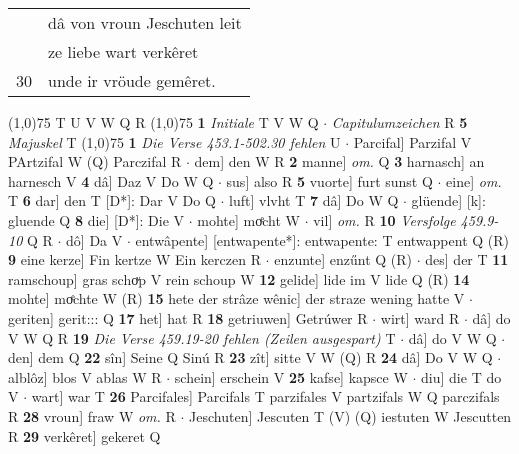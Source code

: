 \documentclass[8pt,a4paper,notitlepage]{article}
\begin{document}
\begin{table}[ht]
\begin{minipage}[t]{0.5\linewidth}
\begin{tabular}{rl}
 & dâ von vroun Jeschuten leit\\ 
 & ze liebe wart verkêret\\ 
30 & unde ir vröude gemêret.\\ 
\end{tabular}
\scriptsize
\line(1,0){75} \newline
T U V W Q R \newline
\line(1,0){75} \newline
\textbf{1} \textit{Initiale} T V W Q   $\cdot$ \textit{Capitulumzeichen} R  \textbf{5} \textit{Majuskel} T  \newline
\line(1,0){75} \newline
\textbf{1} \textit{Die Verse 453.1-502.30 fehlen} U   $\cdot$ Parcifal] Parzifal V PArtzifal W (Q) Parczifal R  $\cdot$ dem] den W R \textbf{2} manne] \textit{om.} Q \textbf{3} harnasch] an harnesch V \textbf{4} dâ] Daz V Do W Q  $\cdot$ sus] also R \textbf{5} vuorte] furt sunst Q  $\cdot$ eine] \textit{om.} T \textbf{6} dar] den T [D*]: Dar V Do Q  $\cdot$ luft] vlvht T \textbf{7} dâ] Do W Q  $\cdot$ glüende] [k]: gluende Q \textbf{8} die] [D*]: Die V  $\cdot$ mohte] moͤcht W  $\cdot$ vil] \textit{om.} R \textbf{10} \textit{Versfolge 459.9-10} Q R   $\cdot$ dô] Da V  $\cdot$ entwâpente] [entwapente*]: entwapente: T entwappent Q (R) \textbf{9} eine kerze] Fin kertze W Ein kerczen R  $\cdot$ enzunte] enzűnt Q (R)  $\cdot$ des] der T \textbf{11} ramschoup] gras schoͮp V rein schoup W \textbf{12} gelide] lide im V lide Q (R) \textbf{14} mohte] moͤchte W (R) \textbf{15} hete der strâze wênic] der straze wening hatte V  $\cdot$ geriten] gerit::: Q \textbf{17} het] hat R \textbf{18} getriuwen] Getrúwer R  $\cdot$ wirt] ward R  $\cdot$ dâ] do V W Q R \textbf{19} \textit{Die Verse 459.19-20 fehlen (Zeilen ausgespart)} T   $\cdot$ dâ] do V W Q  $\cdot$ den] dem Q \textbf{22} sîn] Seine Q Sinú R \textbf{23} zît] sitte V W (Q) R \textbf{24} dâ] Do V W Q  $\cdot$ alblôz] blos V ablas W R  $\cdot$ schein] erschein V \textbf{25} kafse] kapsce W  $\cdot$ diu] die T do V  $\cdot$ wart] war T \textbf{26} Parcifales] Parcifals T parzifales V partzifals W Q parczifals R \textbf{28} vroun] fraw W \textit{om.} R  $\cdot$ Jeschuten] Jescuten T (V) (Q) iestuten W Jescutten R \textbf{29} verkêret] gekeret Q \newline
\end{minipage}
\end{table}
\end{document}
